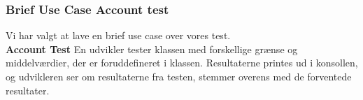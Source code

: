 \subsubsection{Brief Use Case Account test}
Vi har valgt at lave en brief use case over vores test.
\\

\textbf{Account Test}
En udvikler tester klassen med forskellige grænse og middelværdier, der er foruddefineret i klassen. Resultaterne printes ud i konsollen, og udvikleren ser om resultaterne fra testen, stemmer overens med de forventede resultater.